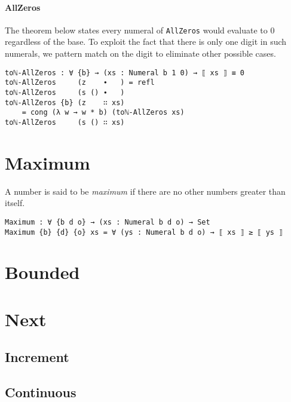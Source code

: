 \documentclass[../thesis.tex]{subfiles}
\begin{document}
\paragraph{AllZeros}

The theorem below states every numeral of {\lstinline|AllZeros|}
would evaluate to $ 0 $ regardless of the base.
To exploit the fact that there is only one digit in such numerals, we pattern
match on the digit to eliminate other possible cases.

\begin{lstlisting}
toℕ-AllZeros : ∀ {b} → (xs : Numeral b 1 0) → ⟦ xs ⟧ ≡ 0
toℕ-AllZeros     (z    ∙   ) = refl
toℕ-AllZeros     (s () ∙   )
toℕ-AllZeros {b} (z    ∷ xs)
    = cong (λ w → w * b) (toℕ-AllZeros xs)
toℕ-AllZeros     (s () ∷ xs)
\end{lstlisting}


\section{Maximum}

A number is said to be \textit{maximum} if there are no other numbers greater than
itself.

\begin{lstlisting}
Maximum : ∀ {b d o} → (xs : Numeral b d o) → Set
Maximum {b} {d} {o} xs = ∀ (ys : Numeral b d o) → ⟦ xs ⟧ ≥ ⟦ ys ⟧
\end{lstlisting}


%
%
%


\section{Bounded}
\section{Next}
\subsection{Increment}
\subsection{Continuous}


%
%
%
\end{document}
